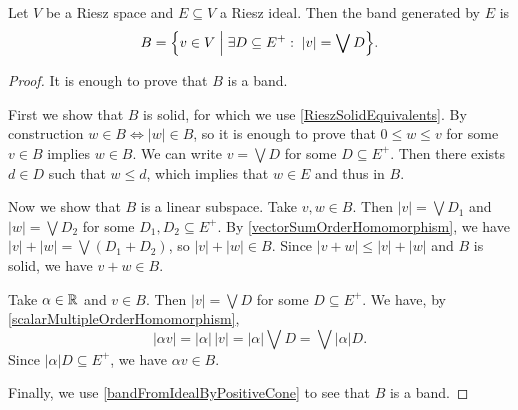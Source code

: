 \begin{proposition} \label{bandGeneratedByRieszIdeal}
Let $V$ be a Riesz space and $E\subseteq V$ a Riesz ideal. Then the band generated by $E$ is
\[ B = \setbuilder{v\in V}{\exists D\subseteq E^+: \; |v| = \bigvee D}. \]
\end{proposition}
\begin{proof}
It is enough to prove that $B$ is a band.

First we show that $B$ is solid, for which we use \ref{RieszSolidEquivalents}. By construction $w\in B \iff |w| \in B$, so it is enough to prove that $0\leq w \leq v$ for some $v\in B$ implies $w\in B$. We can write $v = \bigvee D$ for some $D\subseteq E^+$. Then there exists $d\in D$ such that $w \leq d$, which implies that $w\in E$ and thus in $B$.

Now we show that $B$ is a linear subspace. Take $v,w\in B$. Then $|v| = \bigvee D_1$ and $|w| = \bigvee D_2$ for some $D_1, D_2\subseteq E^+$. By \ref{vectorSumOrderHomomorphism}, we have $|v|+|w| = \bigvee (D_1+D_2)$, so $|v|+|w|\in B$. Since $|v+w|\leq |v|+|w|$ and $B$ is solid, we have $v+w\in B$.

Take $\alpha\in \mathbb{R}$ and $v\in B$. Then $|v| = \bigvee D$ for some $D\subseteq E^+$. We have, by \ref{scalarMultipleOrderHomomorphism},
\[ |\alpha v| = |\alpha|\,|v| = |\alpha|\bigvee D = \bigvee |\alpha|D. \]
Since $|\alpha|D\subseteq E^+$, we have $\alpha v\in B$.

Finally, we use \ref{bandFromIdealByPositiveCone} to see that $B$ is a band.
\end{proof}

